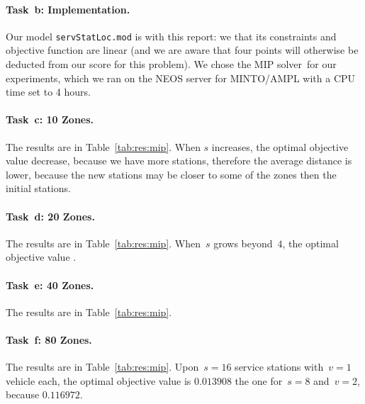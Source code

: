 \paragraph{Task~b: Implementation.}
Our model \texttt{servStatLoc.mod} is  with this
report: we  that its constraints and objective function
are linear (and we are aware that four points will otherwise be
deducted from our score for this problem).
%
We chose the MIP solver~\SolverMIP for our experiments, which we ran on the NEOS server for MINTO/AMPL with a CPU time set to 4 hours. 

\paragraph{Task~c: 10 Zones.}
The results are in Table~\ref{tab:res:mip}.
% 
When $s$ increases, the optimal objective value decrease, because we have more stations, therefore the average distance is lower, because the new stations may be closer to some of the zones then the initial stations. 

\paragraph{Task~d: 20 Zones.}
The results are in Table~\ref{tab:res:mip}.
%
When~$s$ grows beyond~$4$, the optimal objective value \todo{\filler}.

\paragraph{Task~e: 40 Zones.}
The results are in Table~\ref{tab:res:mip}.

\paragraph{Task~f: 80 Zones.}
The results are in Table~\ref{tab:res:mip}.
%
Upon~$s=16$ service stations with~$v=1$ vehicle each, the optimal
objective value is $0.013908$ the one for~$s=8$ and~$v=2$, because
$0.116972$.

